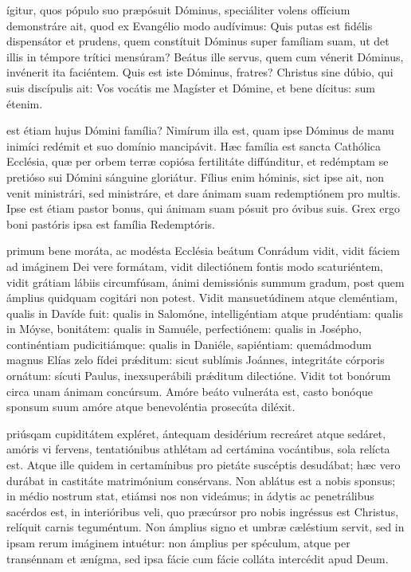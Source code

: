 \documentclass[fontsize=9pt,paper=A6,twoside,BCOR=1mm,DIV=22,headinclude]{scrarticle}
\begin{document}
\begin{multicols}{2}
{\RVCPvii 

 ígitur, quos pópulo suo præpósuit Dóminus, speciáliter volens offícium demonstráre ait, quod ex Evangélio modo audívimus: Quis putas est fidélis dispensátor et prudens, quem constítuit Dóminus super famíliam suam, ut det illis in témpore trítici mensúram? Beátus ille servus, quem cum vénerit Dóminus, invénerit ita faciéntem. Quis est iste Dóminus, fratres? Christus sine dúbio, qui suis discípulis ait: Vos vocátis me Magíster et Dómine, et bene dícitus: sum étenim. 

\RVCPviii 

 est étiam hujus Dómini família? Nimírum illa est, quam ipse Dóminus de manu inimíci redémit et suo domínio mancipávit. Hæc família est sancta Cathólica Ecclésia, quæ per orbem terræ copiósa fertilitáte diffúnditur, et redémptam se pretióso sui Dómini sánguine gloriátur. Fílius enim hóminis, sict ipse ait, non venit ministrári, sed ministráre, et dare ánimam suam redemptiónem pro multis. Ipse est étiam pastor bonus, qui ánimam suam pósuit pro óvibus suis. Grex ergo boni pastóris ipsa est família Redemptóris. 

\Te 

}



{
 primum bene moráta, ac modésta Ecclésia beátum Conrádum vidit, vidit fáciem ad imáginem Dei vere formátam, vidit dilectiónem fontis modo scaturiéntem, vidit grátiam lábiis circumfúsam, ánimi demissiónis summum gradum, post quem ámplius quidquam cogitári non potest. Vidit mansuetúdinem atque cleméntiam, qualis in Davíde fuit: qualis in Salomóne, intelligéntiam atque prudéntiam: qualis in Móyse, bonitátem: qualis in Samuéle, perfectiónem: qualis in Josépho, continéntiam pudicitiámque: qualis in Daniéle, sapiéntiam: quemádmodum magnus Elías zelo fídei pr\'æditum: sicut sublímis Joánnes, integritáte córporis ornátum: sícuti Paulus, inexsuperábili pr\'æditum dilectióne. Vidit tot bonórum circa unam ánimam concúrsum. Amóre beáto vulneráta est, casto bonóque sponsum suum amóre atque benevoléntia prosecúta diléxit.

\RVCPiv 

 priúsqam cupiditátem expléret, ántequam desidérium recreáret atque sedáret, amóris vi fervens, tentatiónibus athlétam ad certámina vocántibus, sola relícta est. Atque ille quidem in certamínibus pro pietáte suscéptis desudábat; hæc vero durábat in castitáte matrimónium consérvans. Non ablátus est a nobis sponsus; in médio nostrum stat, etiámsi nos non videámus; in ádytis ac penetrálibus sacérdos est, in interióribus veli, quo præcúrsor pro nobis ingréssus est Christus, relíquit carnis teguméntum. Non ámplius signo et umbræ cæléstium servit, sed in ipsam rerum imáginem intuétur: non ámplius per spéculum, atque per transénnam et ænígma, sed ipsa fácie cum fácie colláta intercédit apud Deum.

}
\end{multicols}
\end{document}
